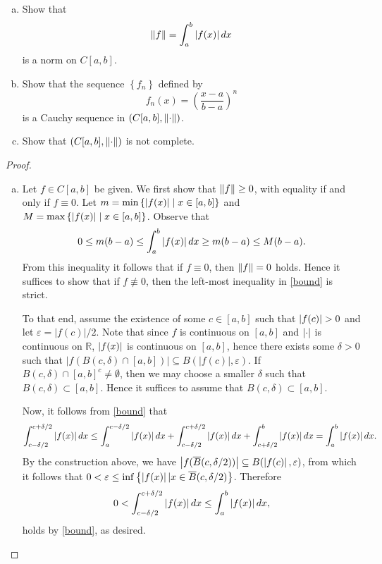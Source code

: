 \documentclass[10pt]{amsart}
\begin{document}
\begin{ex25}{}
  \begin{enumerate}[(a)]
  \item\label{25a}
    Show that 
    $$\lVert f\rVert = \int_a^b \left| f(x) \right|dx$$
    is a norm on $C[a,b]$.
  \item\label{25b}
    Show that the sequence $\left\{f_n\right\}$ defined by 
    $$f_n(x) = \left(\frac{x-a}{b-a}\right)^n$$
    is a Cauchy sequence in $(C[a,b], \lVert\cdot\rVert)$.
  \item\label{25c}
    Show that $(C[a,b], \lVert\cdot\rVert)$ is not complete.
  \end{enumerate}

  \begin{proof}
    \begin{enumerate}[(a)]
    \item
	  Let $f \in C[a,b]$ be given.
      We first show that $\lVert f\rVert \geq 0$, with equality if and only if $f \equiv 0$.
      Let $m = \min \left\{ \left| f(x) \right| \mid x \in [a,b] \right\}$ and $M = \max \left\{ \left| f(x) \right| \mid x \in [a,b] \right\}$.
	  Observe that
	  \begin{equation}\label{bound}
		0 \leq m(b-a) \leq \int_a^b \left| f(x) \right|dx \geq m(b-a) \leq M(b-a).
	  \end{equation}
      From this inequality it follows that if $f \equiv 0$, then $\lVert f\rVert = 0$ holds.
	  Hence it suffices to show that if $f \not \equiv 0$, then the left-most inequality in \eqref{bound} is strict.
      
	  To that end, assume the existence of some $c \in [a,b]$ such that $\left| f(c) \right| > 0$ and let $\varepsilon = |f(c)|/2$.
      Note that since $f$ is continuous on $[a,b]$ and $\left| \cdot \right|$ is continuous on $\mathbb{R}$, $\left| f(x) \right|$ is continuous on $[a,b]$, hence there exists some $\delta > 0$ such that $|f(B(c,\delta) \cap [a,b])| \subseteq B(|f(c)|,\varepsilon)$.
      If $B(c,\delta) \cap [a,b]^c \not = \emptyset$, then we may choose a smaller $\delta$ such that $B(c,\delta) \subset [a,b]$.
      Hence it suffices to assume that $B(c,\delta) \subset [a,b]$.
      
      Now, it follows from \eqref{bound} that
      $$\int_{c-\delta/2}^{c+\delta/2} \left| f(x) \right|dx \leq \int_a^{c-\delta/2} \left| f(x) \right|dx + \int_{c-\delta/2}^{c+\delta/2} \left| f(x) \right|dx + \int_{c+\delta/2}^b \left| f(x) \right|dx = \int_a^b \left| f(x) \right|dx.$$
      By the construction above, we have $\left| f(\overline{B}(c,\delta/2)) \right| \subseteq B(\left| f(c) \right|,\varepsilon)$, from which it follows that $0 < \varepsilon \leq \inf \left\{\left| f(x) \right| | x \in \overline{B}(c,\delta/2) \right\}$.
      Therefore
      $$0 < \int_{c-\delta/2}^{c+\delta/2} \left| f(x) \right|dx \leq \int_a^b \left| f(x) \right|dx,$$
      holds by \eqref{bound}, as desired.
      

\end{enumerate}
\end{proof}
\end{ex25}
\end{document}
